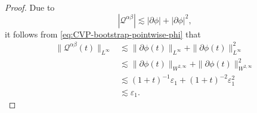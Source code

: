\documentclass[10pt,a4paper]{amsart}
\def\cQ{\mathcal Q}
\def\ls{\lesssim}
\begin{document}
\begin{proof}
		Due to
		\begin{equation}\label{eq:Chaplygin-Q-pointwise}
			|\cQ^{\alpha\beta}|
			\ls
			|\partial\phi|
			+
			|\partial\phi|^2,
		\end{equation}
		it follows from \eqref{eq:CVP-bootstrap-pointwise-phi} that
		\begin{equation}\label{eq:Chaplygin-Q-Linfty}
			\begin{aligned}
				\|\cQ^{\alpha\beta}(t)\|_{L^\infty}
				&\ls
				\|\partial\phi(t)\|_{L^\infty}
				+
				\|\partial\phi(t)\|_{L^\infty}^2
				\\
				&\ls
				\|\partial\phi(t)\|_{W^{2,\infty}}
				+
				\|\partial\phi(t)\|_{W^{2,\infty}}^2
				\\
				&\ls
				(1+t)^{-1}\varepsilon_1
				+
				(1+t)^{-2}\varepsilon_1^2
				\\
				&\ls
				\varepsilon_1.
			\end{aligned}
		\end{equation}
		

\end{proof}
\end{document}
